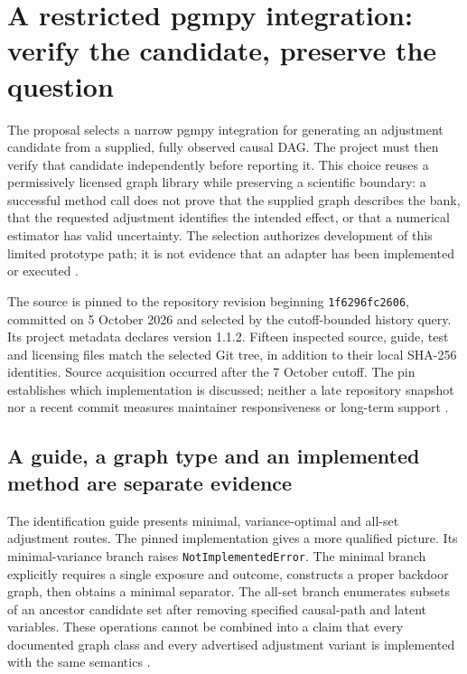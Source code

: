 \section{A restricted pgmpy integration: verify the candidate, preserve the question}
\label{exec13:pgmpy-reuse}

The proposal selects a narrow pgmpy integration for generating an adjustment
candidate from a supplied, fully observed causal DAG. The project must then
verify that candidate independently before reporting it. This choice reuses
a permissively licensed graph library while preserving a scientific boundary:
a successful method call does not prove that the supplied graph describes
the bank, that the requested adjustment identifies the intended effect, or
that a numerical estimator has valid uncertainty. The selection authorizes
development of this limited prototype path; it is not evidence that an
adapter has been implemented or executed
\citep{exec13_pgmpy_reuse_primary,exec13_pgmpy_reuse_oracle}.

The source is pinned to the repository revision beginning
\texttt{1f6296fc2606}, committed on 5 October 2026 and selected by the
cutoff-bounded history query. Its project metadata declares version 1.1.2.
Fifteen inspected source, guide, test and licensing files match the selected
Git tree, in addition to their local SHA-256 identities. Source acquisition
occurred after the 7 October cutoff. The pin establishes which implementation
is discussed; neither a late repository snapshot nor a recent commit measures
maintainer responsiveness or long-term support
\citep{exec13_pgmpy_reuse_primary}.

\subsection{A guide, a graph type and an implemented method are separate evidence}

The identification guide presents minimal, variance-optimal and all-set
adjustment routes. The pinned implementation gives a more qualified picture.
Its minimal-variance branch raises \texttt{NotImplementedError}. The minimal
branch explicitly requires a single exposure and outcome, constructs a
proper backdoor graph, then obtains a minimal separator. The all-set branch
enumerates subsets of an ancestor candidate set after removing specified
causal-path and latent variables. These operations cannot be combined into
a claim that every documented graph class and every advertised adjustment
variant is implemented with the same semantics
\citep{exec13_pgmpy_reuse_primary}.

